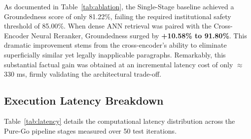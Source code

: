 \documentclass[conference]{IEEEtran}
\begin{document}
\begin{table}[htbp]
\caption{Ablation Study: Single-Stage Baseline vs. Proposed Two-Stage RAG}
\label{tab:ablation}
\centering
{}
\end{table}

As documented in Table~\ref{tab:ablation}, the Single-Stage baseline achieved a Groundedness score of only 81.22\%, failing the required institutional safety threshold of 85.00\%. When dense ANN retrieval was paired with the Cross-Encoder Neural Reranker, Groundedness surged by \textbf{+10.58\% to 91.80\%}. This dramatic improvement stems from the cross-encoder's ability to eliminate superficially similar yet legally inapplicable paragraphs. Remarkably, this substantial factual gain was obtained at an incremental latency cost of only $\approx$330 ms, firmly validating the architectural trade-off.

\subsection{Execution Latency Breakdown}
Table~\ref{tab:latency} details the computational latency distribution across the Pure-Go pipeline stages measured over 50 test iterations.

\begin{table}[htbp]
\caption{Latency Breakdown Across Two-Stage Pipeline Operations}
\label{tab:latency}
\centering
{}
\end{table}
\end{document}
